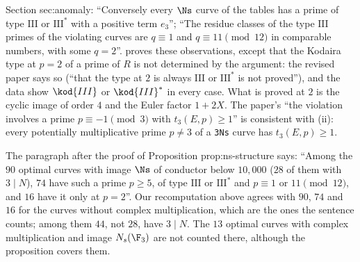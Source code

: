 \begin{paperlink}
Section sec:anomaly: ``Conversely every $\Ns$ curve of the tables has a prime of type $\mathrm{III}$ or $\mathrm{III}^*$ with a positive term $e_3$''; ``The
residue classes of the type $\mathrm{III}$ primes of the violating curves are $q\equiv1$ and $q\equiv11\pmod{12}$ in comparable numbers, with some
$q=2$''.  proves these observations, except that the Kodaira type at $p=2$ of a prime of $R$ is not determined by the
argument: the revised paper says so (``that the type at $2$ is always $\mathrm{III}$ or $\mathrm{III}^*$ is not proved''), and the data show $\kod{III}$ or
$\kod{III}^*$ in every case. What is proved at $2$ is the cyclic image of order $4$ and the Euler factor $1+2X$. The paper's ``the violation involves a prime
$p\equiv-1\pmod3$ with $t_3(E,p)\ge1$'' is consistent with (ii): every potentially multiplicative prime $p\ne3$ of a \texttt{3Ns} curve has $t_3(E,p)\ge1$.

The paragraph after the proof of Proposition prop:ns-structure says: ``Among the $90$ optimal curves with image $\Ns$ of conductor below $10{,}000$ ($28$
of them with $3\mid N$), $74$ have such a prime $p\ge5$, of type $\mathrm{III}$ or $\mathrm{III}^*$ and $p\equiv1$ or $11\pmod{12}$, and $16$ have it only at
$p=2$''. Our recomputation above agrees with $90$, $74$ and $16$ for the curves without complex multiplication, which are the ones the sentence counts;
among them $44$, not $28$, have $3\mid N$. The $13$ optimal curves with complex multiplication and image $N_s(\F_3)$ are not counted there, although the
proposition covers them.
\end{paperlink}

